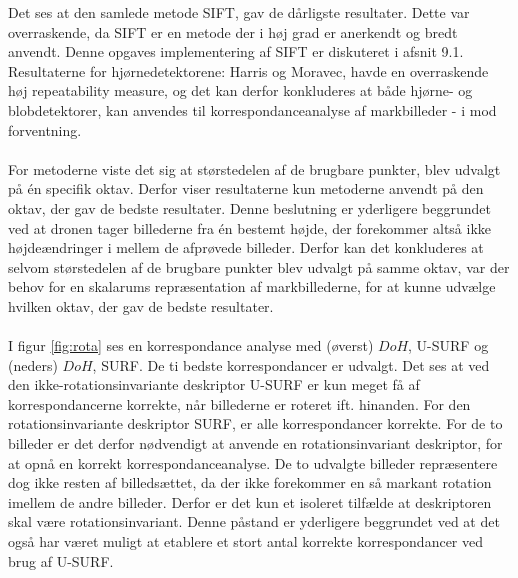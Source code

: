 \noindent
Det ses at den samlede metode SIFT, gav de dårligste resultater. Dette var overraskende, da SIFT er en metode der i høj grad er anerkendt og bredt anvendt. Denne opgaves implementering af SIFT er diskuteret i afsnit 9.1. Resultaterne for hjørnedetektorene: Harris og Moravec, havde en overraskende høj repeatability measure, og det kan derfor konkluderes at både hjørne- og blobdetektorer, kan anvendes til korrespondanceanalyse af markbilleder - i mod forventning.
\\ \\
For metoderne viste det sig at størstedelen af de brugbare punkter, blev udvalgt på én specifik oktav. Derfor viser resultaterne kun metoderne anvendt på den oktav, der gav de bedste resultater. Denne beslutning er yderligere beggrundet ved at dronen tager billederne fra én bestemt højde, der forekommer altså ikke højdeændringer i mellem de afprøvede billeder. Derfor kan det konkluderes at selvom størstedelen af de brugbare punkter blev udvalgt på samme oktav, var der behov for en skalarums repræsentation af markbillederne, for at kunne udvælge hvilken oktav, der gav de bedste resultater.
\\ \\
I figur \ref{fig:rota} ses en korrespondance analyse med (øverst) $DoH$, U-SURF og (neders) $DoH$, SURF. De ti bedste korrespondancer er udvalgt. Det ses at ved den ikke-rotationsinvariante deskriptor U-SURF er kun meget få af korrespondancerne korrekte, når billederne er roteret ift. hinanden. For den rotationsinvariante deskriptor SURF, er alle korrespondancer korrekte. For de to billeder er det derfor nødvendigt at anvende en rotationsinvariant deskriptor, for at opnå en korrekt korrespondanceanalyse. De to udvalgte billeder repræsentere dog ikke resten af billedsættet, da der ikke forekommer en så markant rotation imellem de andre billeder. Derfor er det kun et isoleret tilfælde at deskriptoren skal være rotationsinvariant. Denne påstand er yderligere beggrundet ved at det også har været muligt at etablere et stort antal korrekte korrespondancer ved brug af U-SURF.
